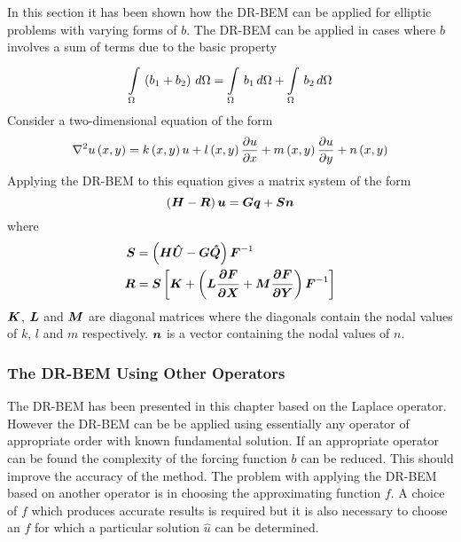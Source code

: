 In this section it has been shown how the DR-BEM can be applied for
elliptic problems with varying forms of $b$.  The DR-BEM can be applied in
cases where $b$ involves a sum of terms due to the basic property
\begin{equation}
     \displaystyle\int\limits_{\Omega}^{} \,\left( b_{1} + b_{2} \right)\,d\Omega   =    \displaystyle\int\limits_{\Omega}^{} \,b_{1}\,d\Omega   +
     \displaystyle\int\limits_{\Omega}^{} \,b_{2}\,d\Omega  
\end{equation}
Consider a two-dimensional equation of the form
\begin{equation}
  \nabla^{2} { u\left( x,y \right) } =  k\left( x,y \right)  u +  l\left( x,y \right)   \dfrac{\partial u}{\partial x}  +
   m\left( x,y \right)   \dfrac{\partial u}{\partial y}  +  n\left( x,y \right) 
\end{equation}
Applying the DR-BEM to this equation gives a matrix system of the form
\begin{equation}
  \pbrac{\matr{H} - \matr{R}} \vect{u} = \matr{G} \vect{q} + \matr{S} \vect{n}
\end{equation}
where
\begin{align}
  \matr{S} & = \pbrac{\matr{H} \matr{\hat{U}} - \matr{G} \matr{\hat{Q}}}
  \matr{F}^{-1} \label{eq:srelate} \\ \matr{R} & = \matr{S} \sqbrac{\matr{K} +
    \pbrac{\matr{L} \matr{\delby{F}{x}} + \matr{M} \matr{\delby{F}{y}}}
  \matr{F}^{-1}}
\label{eq:rrelate} 
\end{align}
$\matr{K}$, $\matr{L}$ and $\matr{M}$ are diagonal matrices where the
diagonals contain the nodal values of $k$, $l$ and $m$ respectively.
$\vect{n}$ is a vector containing the nodal values of $n$.  

\subsubsection{The DR-BEM Using Other Operators}
\label{sec:otheroperators}

The DR-BEM has been presented in this chapter based on the Laplace
operator.  However the DR-BEM can be be applied using essentially any
operator of appropriate order with known fundamental solution.  If an
appropriate operator can be found the complexity of the forcing function
$b$ can be reduced.  This should improve the accuracy of the method.  The
problem with applying the DR-BEM based on another operator is in
choosing the approximating function $f$.  A choice of $f$ which produces
accurate results is required but it is also necessary to choose an $f$ for
which a particular solution $\hat{u}$ can be determined. 

